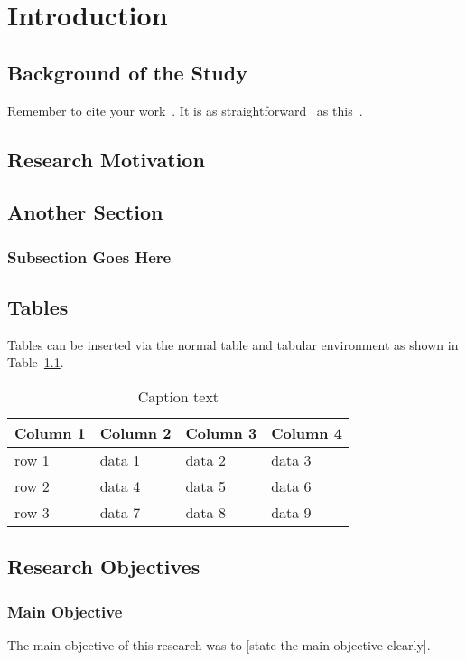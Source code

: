 \chapter{Introduction}
\label{chap:introduction}

\section{Background of the Study}
Remember to cite your work~\cite{greenwade93}. It is as straightforward~\cite{greenwade93} as this~\cite{greenwade93}.

\section{Research Motivation}

\section{Another Section}
\subsection{Subsection Goes Here}
\section{Tables}\label{sec5}

Tables can be inserted via the normal table and tabular environment as shown in Table~\ref{tab1}. 

\begin{table}[h]
\centering
\caption{Caption text}
\label{tab1}%
\begin{tabular}{@{}llll@{}}
\toprule
Column 1 & Column 2  & Column 3 & Column 4\\
\midrule
row 1    & data 1   & data 2  & data 3  \\
row 2    & data 4   & data 5 & data 6  \\
row 3    & data 7   & data 8  & data 9  \\
\bottomrule
\end{tabular}
\end{table}

\section{Research Objectives}
\subsection{Main Objective}
The main objective of this research was to [state the main objective clearly].

